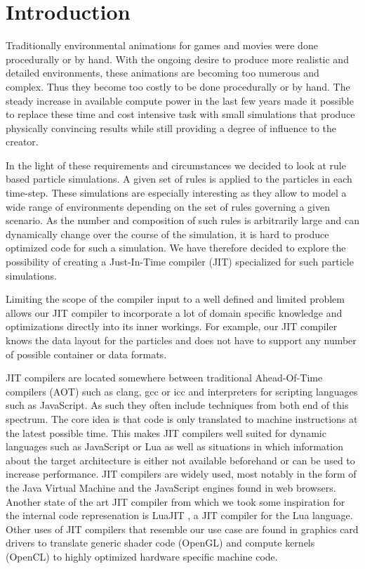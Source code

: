 \section{Introduction}\label{sec:intro}

Traditionally environmental animations for games and movies were done procedurally or by hand. 
With the ongoing desire to produce more realistic and detailed environments, these animations are becoming too numerous and complex.
Thus they become too costly to be done procedurally or by hand. 
The steady increase in available compute power in the last few years made it possible to replace these time and cost intensive task with small simulations that produce physically convincing results while still providing a degree of influence to the creator.

In the light of these requirements and circumstances we decided to look at rule based particle simulations.
A given set of rules is applied to the particles in each time-step.
These simulations are especially interesting as they allow to model a wide range of environments depending on the set of rules governing a given scenario. 
As the number and composition of such rules is arbitrarily large and can dynamically change over the course of the simulation, it is hard to produce optimized code for such a simulation. We have therefore decided to explore the possibility of creating a Just-In-Time compiler (JIT) specialized for such particle simulations.

Limiting the scope of the compiler input to a well defined and limited problem allows our JIT compiler to incorporate a lot of domain specific knowledge and optimizations directly into its inner workings. For example, our JIT compiler knows the data layout for the particles and does not have to support any number of possible container or data formats.

JIT compilers are located somewhere between traditional Ahead-Of-Time compilers (AOT) such as clang\cite{clang}, gcc\cite{gcc} or icc\cite{icc} and interpreters for scripting languages such as JavaScript. As such they often include techniques from both end of this spectrum. The core idea is that code is only translated to machine instructions at the latest possible time. This makes JIT compilers well suited for dynamic languages such as JavaScript or Lua as well as situations in which information about the target architecture is either not available beforehand or can be used to increase performance. JIT compilers are widely used, most notably in the form of the Java Virtual Machine\cite{jvm} and the JavaScript\cite{v8}\cite{SpiderMonkey} engines found in web browsers. Another state of the art JIT compiler from which we took some inspiration for the internal code represenation is LuaJIT \cite{LuaJIT}\cite{LuaJITir}, a JIT compiler for the Lua language. Other uses of JIT compilers that resemble our use case are found in graphics card drivers to translate generic shader code (OpenGL) and compute kernels (OpenCL) to highly optimized hardware specific machine code.

